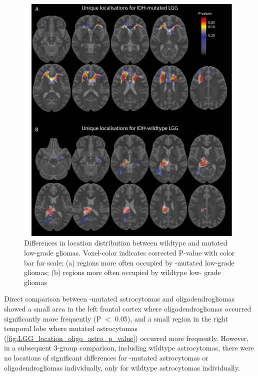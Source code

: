     \begin{figure}
    \centering
    \includegraphics[width=\textwidth]{Figures/Figure_2.png}
    \caption{Differences in location distribution between  wildtype and mutated low-grade gliomas. Voxel-color indicates corrected P-value with
    color bar for scale; (a) regions more often occupied by -mutated low-grade gliomas; (b) regions more often occupied by  wildtype low-
    grade gliomas}\label{fig:LGG_location_P_values}
    \end{figure}


Direct comparison between -mutated astrocytomas and oligodendrogliomas showed a small area in the left frontal cortex where oligodendrogliomas occurred significantly more frequently (P $<$ 0.05), and a small region in the right temporal lobe where  mutated astrocytomas (\cref{fig:LGG_location_oligo_astro_p_value}) occurred more frequently.
However, in a subsequent 3-group comparison, including  wildtype astrocytomas, there were no locations of significant differences for -mutated astrocytomas or oligodendrogliomas individually, only for  wildtype astrocytomas individually.


